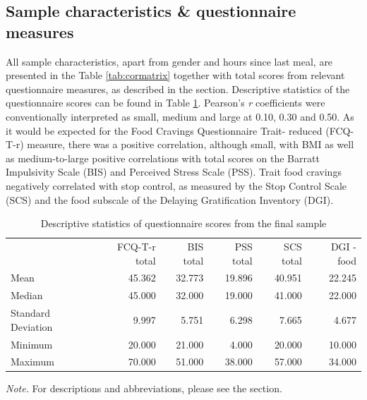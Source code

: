 \begin{appendix}
\hypertarget{appendix_cormatrix}{%
\section{Sample characteristics \& questionnaire
measures}\label{appendix_cormatrix}}

\par

All sample characteristics, apart from gender and hours since last meal,
are presented in the Table \ref{tab:cormatrix} together with total
scores from relevant questionnaire measures, as described in the
\textit{} section. Descriptive statistics of the
questionnaire scores can be found in Table \ref{tab:questionnaires}.
Pearson's \textit{r} coefficients were conventionally interpreted as
small, medium and large at 0.10, 0.30 and 0.50. As it would be expected
for the Food Cravings Questionnaire Trait- reduced (FCQ-T-r) measure,
there was a positive correlation, although small, with BMI as well as
medium-to-large positive correlations with total scores on the Barratt
Impulsivity Scale (BIS) and Perceived Stress Scale (PSS). Trait food
cravings negatively correlated with stop control, as measured by the
Stop Control Scale (SCS) and the food subscale of the Delaying
Gratification Inventory (DGI).

\begin{table}[h]
    \centering
    \caption{Descriptive statistics of questionnaire scores from the final sample}
    \label{tab:questionnaires}
    {
        \begin{tabular}{lrrrrr}
            \toprule
             & FCQ-T-r total & BIS total & PSS total & SCS total & DGI - food   \\
            \cmidrule[0.4pt]{1-6}
            Mean & 45.362 & 32.773 & 19.896 & 40.951 & 22.245  \\
            Median & 45.000 & 32.000 & 19.000 & 41.000 & 22.000  \\
            Standard Deviation & 9.997 & 5.751 & 6.298 & 7.665 & 4.677  \\
            Minimum & 20.000 & 21.000 & 4.000 & 20.000 & 10.000  \\
            Maximum & 70.000 & 51.000 & 38.000 & 57.000 & 34.000  \\
            \bottomrule
        \end{tabular}
    }
\begin{tablenotes}[para]
\footnotesize{\textit{Note.} For descriptions and abbreviations, please see the \textit{} section.}
\end{tablenotes}
\end{table}


\end{appendix}

